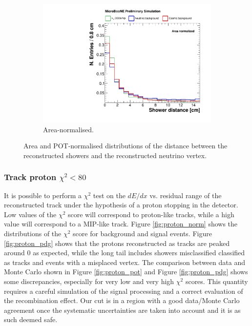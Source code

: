 \begin{figure}[htbp]
\begin{subfigure}{0.49\textwidth}
    \includegraphics[width=\linewidth]{figures/h_shower_distance_norm.pdf}
    \caption{Area-normalised.} \label{fig:showerd_norm}
  \end{subfigure}
  \caption{Area and POT-normalised distributions of the distance between the reconstructed showers and the reconstructed neutrino vertex.}
\end{figure}

\subsubsection*{Track proton $\chi^2 < 80$}
It is possible to perform a $\chi^2$ test on the $dE/dx$ vs. residual range of the reconstructed track under the hypothesis of a proton stopping in the detector. Low values of the $\chi^2$ score will correspond to proton-like tracks, while a high value will correspond to a MIP-like track. Figure \ref{fig:proton_norm} shows the distributions of the $\chi^2$ score for background and signal events. Figure \ref{fig:proton_pdg} shows that the protons reconstructed as tracks are peaked around 0 as expected, while the long tail includes showers misclassified classified as tracks and events with a misplaced vertex. The comparison between data and Monte Carlo shown in Figure \ref{fig:proton_pot} and Figure \ref{fig:proton_pdg} shows some discrepancies, especially for very low and very high $\chi^2$ scores. This quantity requires a careful simulation of the signal processing and a correct evaluation of the recombination effect. Our cut is in a region with a good data/Monte Carlo agreement once the systematic uncertainties are taken into account and it is as such deemed safe.

